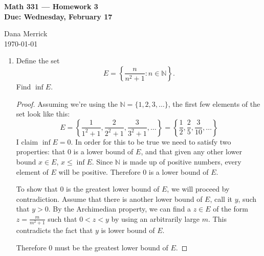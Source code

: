 \documentclass[12pt]{amsart}
\begin{document}
\thispagestyle{empty}

\begin{center}
{\bf Math 331  --- Homework 3 \\
Due:  Wednesday, February 17}
\end{center}

\bigskip

\noindent
Dana Merrick \\
\today

\bigskip

\begin{enumerate}

\setlength{\itemsep}{6pt}

\item Define the set
%
\[ E = \left\{ \frac{n}{n^2+1} : n \in \mathbb{N}\right\}. \]
%
Find $\inf E$.
\begin{proof}
Assuming we're using the $\mathbb N = \{1,2,3,\ldots\}$, the first few elements of the set look like this:
\[ E = \left\{ \frac{1}{1^2+1}, \frac{2}{2^2+1}, \frac{3}{3^2+1}, \ldots\right\} = 
\left\{\frac 1 2, \frac 2 5, \frac 3 {10}, \ldots\right\} \]
I claim $\inf E = 0$. In order for this to be true we need to satisfy two properties: that $0$ is a lower bound of $E$, and that given any other lower bound $x\in E$, $x\le\inf E$. Since $\mathbb N$ is made up of positive numbers, every element of $E$ will be positive. Therefore $0$ is a lower bound of $E$.

To show that $0$ is the greatest lower bound of $E$, we will proceed by contradiction. Assume that there is another lower bound of $E$, call it $y$, such that $y>0$. By the Archimedian property, we can find a $z\in E$ of the form $z= \frac m {m^2+1}$ such that $0<z<y$ by using an arbitrarily large $m$.
This contradicts the fact that $y$ is lower bound of $E$.

Therefore $0$ must be the greatest lower bound of $E$.
\end{proof}

\end{enumerate} 
\end{document}
